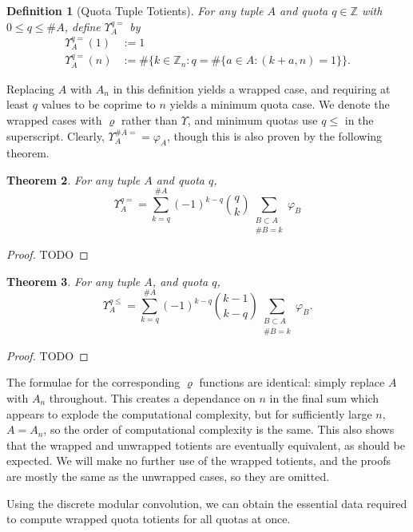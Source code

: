 \documentclass[11pt, leqno]{article}
\newtheorem{theorem}{Theorem}[section]
\newtheorem{definition}[theorem]{Definition}
\begin{document}
\begin{definition}[Quota Tuple Totients]
    For any tuple $A$ and quota $q\in\mathbb{Z}$ with $0 \le q \le \#A$, define 
    $\varUpsilon^{q=}_A$ by
    \begin{align*}
        \varUpsilon^{q=}_A(1) &:= 1 \\
        \varUpsilon^{q=}_A(n) &:= \#\{k\in\mathbb{Z}_n : q = 
            \#\{a \in A : (k+a,n)=1\} \}.
    \end{align*}
\end{definition}

Replacing $A$ with $A_n$ in this definition yields a wrapped case, and 
requiring at least $q$ values to be coprime to $n$ yields a minimum quota
case. 
We denote the wrapped cases with $\varrho$ rather than $\varUpsilon$,
and minimum quotas use $q\le$ in the superscript.
Clearly, $\varUpsilon_A^{\#A=}=\varphi_A$, though this is also
proven by the following theorem.

\begin{theorem}
    For any tuple $A$ and quota $q$,
    $$\varUpsilon^{q=}_A = \sum_{k=q}^{\#A}(-1)^{k-q}
        { q \choose k }
        \sum_{\substack{B\subset A \\ \#B = k}}\varphi_B$$
\end{theorem}
\begin{proof}
    TODO
\end{proof}

\begin{theorem}
    For any tuple $A$, and quota $q$,
    $$\varUpsilon^{q\le}_A = \sum_{k=q}^{\#A}(-1)^{k-q}
        {k-1 \choose k-q}
        \sum_{\substack{B\subset A \\ \#B = k}}\varphi_B.$$
\end{theorem}
\begin{proof}
TODO
\end{proof}

The formulae for the corresponding $\varrho$ functions are identical:
simply replace $A$ with $A_n$ throughout.
This creates a dependance on $n$ in the final sum which appears to
explode the computational complexity, but for sufficiently
large $n$, $A = A_n$, so the order of computational complexity is the same.
This also shows that the wrapped and unwrapped totients are
eventually equivalent, as should be expected.
We will make no further use of the wrapped totients, and the proofs are
mostly the same as the unwrapped cases, so they are omitted.

Using the discrete modular convolution, we can obtain
the essential data required to compute wrapped quota totients
for all quotas at once.
\end{document}
